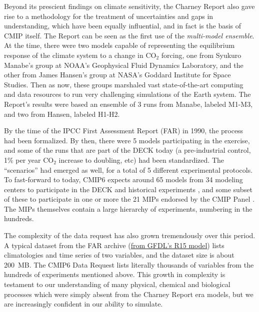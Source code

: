 \documentclass[gmd,manuscript]{copernicus}
\begin{document}
Beyond its prescient findings on climate sensitivity, the Charney
Report also gave rise to a methodology for the treatment of
uncertainties and gaps in understanding, which have been equally
influential, and in fact is the basis of CMIP itself. The Report can
be seen as the first use of the \emph{multi-model ensemble}. At the
time, there were two models capable of representing the equilibrium
response of the climate system to a change in CO$_2$ forcing, one from
Syukuro Manabe's group at NOAA's Geophysical Fluid Dynamics
Laboratory, and the other from James Hansen's group at NASA's Goddard
Institute for Space Studies. Then as now, these groups marshaled vast
state-of-the-art computing and data resources to run very challenging
simulations of the Earth system. The Report's results were based an
ensemble of 3 runs from Manabe, labeled M1-M3, and two from Hansen,
labeled H1-H2.

By the time of the IPCC First Assessment Report (FAR) in 1990, the
process had been formalized. By then, there were 5 models
participating in the exercise, and some of the runs that are part of
the DECK today (a pre-industrial control, 1\% per year CO$_2$ increase
to doubling, etc) had been standardized. The ``scenarios'' had emerged
as well, for a total of 5 different experimental protocols. To
fast-forward to today, CMIP6 expects around 65 models from 34 modeling
centers \citep[in 14 countries, in stark contrast to the US monopoly
in][]{ref:charneyetal1979} to participate in the DECK and historical
experiments \citep[Table~2 of][]{ref:eyringetal2016a}, and some subset
of these to participate in one or more the 21 MIPs endorsed by the
CMIP Panel \citep[Table~3 of][]{ref:eyringetal2016a}. The MIPs
themselves contain a large hierarchy of experiments, numbering in the
hundreds.

The complexity of the data request has also grown tremendously over
this period. A typical dataset from the FAR archive
(\href{https://goo.gl/M1WSJy}{from GFDL's R15 model}) lists
climatologies and time series of two variables, and the dataset size
is about 200~MB. The CMIP6 Data Request \citep[][replace with GMD
ref?]{ref:juckesetal2015} lists literally thousands of variables from
the hundreds of experiments mentioned above. This growth in complexity
is testament to our understanding of many physical, chemical and
biological processes which were simply absent from the Charney Report
era models, but we are increasingly confident in our ability to
simulate.
\end{document}

